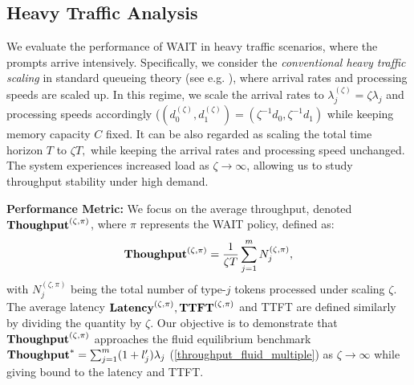 \subsection{Heavy Traffic Analysis}
\label{subsec:heavy_traffic}
We evaluate the performance of WAIT in heavy traffic scenarios, where the prompts arrive intensively. Specifically, we consider the \emph{conventional heavy traffic scaling} in standard queueing theory (see e.g. \cite{mandelbaum1998strong}), where arrival rates and processing speeds are scaled up. In this regime, we scale the arrival rates to $\lambda_j^{(\zeta)} = \zeta \lambda_j$ and processing speeds accordingly ($(d_0^{(\zeta)},d_1^{(\zeta)})=(\zeta^{-1}d_0,\zeta^{-1}d_1)$ while keeping memory capacity $C$ fixed. It can be also regarded as scaling the total time horizon $T$ to $\zeta T,$ while keeping the arrival rates and processing speed unchanged. The system experiences increased load as $\zeta \to \infty$, allowing us to study throughput stability under high demand.



\textbf{Performance Metric:} We focus on the average throughput, denoted $\textbf{Thoughput}^{(\zeta, \pi)}$, where $\pi$ represents the WAIT policy, defined as:
\[
\textbf{Thoughput}^{(\zeta, \pi)} = \frac{1}{\zeta T} \sum_{j=1}^m N_j^{(\zeta, \pi)},
\]
with $N_j^{(\zeta, \pi)}$ being the total number of type-$j$ tokens processed under scaling $\zeta$. The average latency $\textbf{Latency}^{(\zeta,\pi)},\textbf{TTFT}^{(\zeta,\pi)}$ and TTFT are defined similarly by dividing the quantity by $\zeta$. Our objective is to demonstrate that $\textbf{Thoughput}^{(\zeta, \pi)}$ approaches the fluid equilibrium benchmark $\textbf{Thoughput}^* = \sum_{j=1}^m (1+ l_j') \lambda_j$ (\ref{throughput_fluid_multiple}) as $\zeta \to \infty$ while giving bound to the latency and TTFT.

